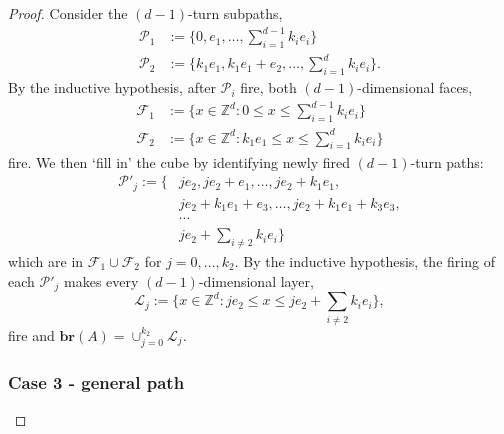 \documentclass[aap]{imsart}
\newcommand{\Z}{\mathbb{Z}}
\newcommand{\br}{\mathbf{br}}  %
\begin{document}
\begin{proof}
	
	Consider the $(d-1)$-turn subpaths, 
	\begin{equation}
	\begin{aligned}
	\mathcal{P}_1 &:= \{0, e_1, \ldots, \sum_{i=1}^{d-1} k_i e_i \} \\
	\mathcal{P}_2 &:= \{k_1 e_1, k_1 e_1 + e_2 , \ldots, \sum_{i=1}^{d} k_i e_i \}.
	\end{aligned}
	\end{equation}
	By the inductive hypothesis, after $\mathcal{P}_i$ fire,  
	both $(d-1)$-dimensional faces, 
	\begin{equation}
	\begin{aligned}
	\mathcal{F}_1 &:= \{x \in \Z^d : 0 \leq x \leq \sum_{i=1}^{d-1} k_i e_i \} \\
	\mathcal{F}_2 &:= \{x \in \Z^d : k_1 e_1 \leq x \leq \sum_{i=1}^{d} k_i e_i \}
	\end{aligned}
	\end{equation}
	fire. We then `fill in' the cube by identifying newly fired $(d-1)$-turn paths:
	\begin{equation}
	\begin{aligned}
	\mathcal{P}'_j := \{ & j  e_2, j e_2 + e_1, \ldots, j e_2 + k_1 e_1,  \\ 
	& j e_2 + k_1 e_1 + e_3, \ldots, j e_2 + k_1 e_1 + k_3 e_3, \\
	& \cdots \\
	&j e_2 + \sum_{i\not=2} k_i e_i \} 
	\end{aligned}
	\end{equation}
	which are in $\mathcal{F}_1 \cup \mathcal{F}_2$ for $j=0, \ldots, k_2$. By the inductive hypothesis, the firing of each $\mathcal{P}'_j$ makes every $(d-1)$-dimensional layer,
	\[
	\mathcal{L}_j := \{x \in \Z^d : j e_2 \leq x \leq j e_2 + \sum_{i\not=2} k_i e_i \},
	\]
	fire and $\br(A) = \cup_{j=0}^{k_2} \mathcal{L}_j$. 
	
	
	
	
	
	
	\subsubsection*{Case 3 - general path}
	

\end{proof}
\end{document}
